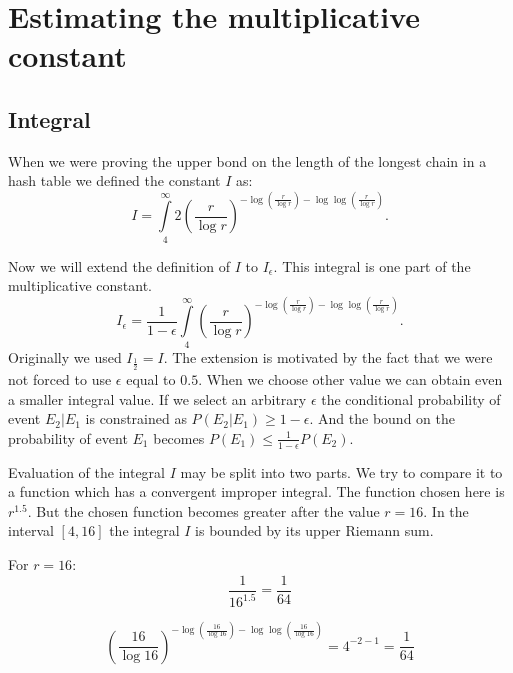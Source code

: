 \section{Estimating the multiplicative constant}

\subsection{Integral}
When we were proving the upper bond on the length of the longest chain in a hash table we defined the constant $I$ as:
\begin{displaymath}
I = \displaystyle\int\limits_4^\infty 2 \left(\frac{r}{\log r}\right)^{-\log \left(\frac{r}{\log r}\right) - \log \log \left(\frac{r}{\log r}\right)}\textit{.}
\end{displaymath}

Now we will extend the definition of $I$ to $I_{\epsilon}$. This integral is one part of the multiplicative constant.
\begin{displaymath}
I_{\epsilon} = \frac{1}{1 - \epsilon} \displaystyle\int\limits_4^\infty \left(\frac{r}{\log r}\right)^{-\log \left(\frac{r}{\log r}\right) - \log \log \left(\frac{r}{\log r}\right)}\textit{.}
\end{displaymath}
Originally we used $I_{\frac{1}{2}} = I$. The extension is motivated by the fact that we were not forced to use $\epsilon$ equal to $0.5$. When we choose other value we can obtain even a smaller integral value. If we select an arbitrary $\epsilon$ the conditional probability of event $E_2 | E_1$ is constrained as $P(E_2 | E_1) \geq 1 - \epsilon$. And the bound on the probability of event $E_1$ becomes $P(E_1) \leq \frac{1}{1-\epsilon} P(E_2)$.

Evaluation of the integral $I$ may be split into two parts. We try to compare it to a function which has a convergent improper integral. The function chosen here is $r^{1.5}$. But the chosen function becomes greater after the value $r = 16$. In the interval $[4, 16]$ the integral $I$ is bounded by its upper Riemann sum.

For $r = 16$:
\begin{displaymath}
\frac{1}{16 ^ {1.5}} = \frac{1}{64}
\end{displaymath}

\begin{displaymath}
\left(\frac{16}{\log 16}\right)^{-\log \left(\frac{16}{\log 16}\right) - \log \log \left(\frac{16}{\log 16}\right)} = 4^{-2 - 1} = \frac{1}{64}
\end{displaymath}

